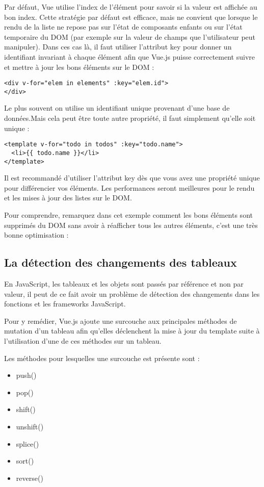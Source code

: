 Par défaut, {\color{monOrange}Vue} utilise l'index de l'élément pour savoir si la valeur est affichée au bon index. Cette stratégie par défaut est efficace, mais ne convient que lorsque le rendu de la liste ne repose pas sur l'état de composants enfants ou sur l'état temporaire du DOM (par exemple sur la valeur de champs que l'utilisateur peut manipuler). Dans ces cas là, il faut utiliser l'attribut key pour donner un identifiant invariant à chaque élément afin que Vue.js puisse correctement suivre et mettre à jour les bons éléments sur le DOM :
\begin{verbatim}
<div v-for="elem in elements" :key="elem.id">
</div>
\end{verbatim}
Le plus souvent on utilise un identifiant unique provenant d'une base de données.Mais cela peut être toute autre propriété, il faut simplement qu'elle soit unique :
\begin{verbatim}
<template v-for="todo in todos" :key="todo.name">
  <li>{{ todo.name }}</li>
</template>
\end{verbatim}
Il est recommandé d'utiliser l'attribut {\color{monOrange}key} dès que vous avez une propriété unique pour différencier vos éléments. Les performances seront meilleures pour le rendu et les mises à jour des listes sur le DOM.

Pour comprendre, remarquez dans cet exemple comment les bons éléments sont supprimés du DOM sans avoir à réafficher tous les autres éléments, c'est une très bonne optimisation :


\subsection{La détection des changements des tableaux}
En JavaScript, les tableaux et les objets sont passés par référence et non par valeur, il peut de ce fait avoir un problème de détection des changements dans les fonctions et les frameworks JavaScript.

Pour y remédier, {\color{monOrange}Vue.js} ajoute une surcouche aux principales méthodes de mutation d'un tableau afin qu'elles déclenchent la mise à jour du {\color{monOrange}template} suite à l'utilisation d'une de ces méthodes sur un tableau.

Les méthodes pour lesquelles une surcouche est présente sont :
\begin{itemize}
\item {\color{blue} push()}
\item {\color{blue} pop()}
\item {\color{blue} shift()}
\item {\color{blue} unshift()}
\item {\color{blue} splice()}
\item {\color{blue} sort()}
\item {\color{blue} reverse()}
\end{itemize}


